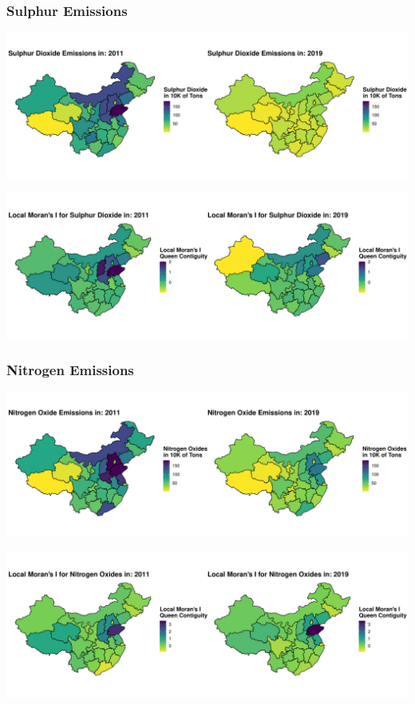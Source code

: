 \documentclass[
]{article}
\begin{document}
	\subsubsection{Sulphur Emissions}
		\begin{center}
		\includegraphics[width = 440pt]{Waste_Gas_Emissions_Sulphur_comp.pdf} 
	\end{center}
	\begin{center}
		\includegraphics[width = 440pt]{Ii_Waste_Gas_Emissions_Sulphur_comp.pdf} 
	\end{center}
	\subsubsection{Nitrogen Emissions}
		\begin{center}
		\includegraphics[width = 440pt]{Waste_Gas_Emissions_Nitrogen_comp.pdf} 
	\end{center}
	\begin{center}
		\includegraphics[width = 440pt]{Ii_Waste_Gas_Emissions_Nitrogen_comp.pdf} 
	\end{center}
\end{document}
